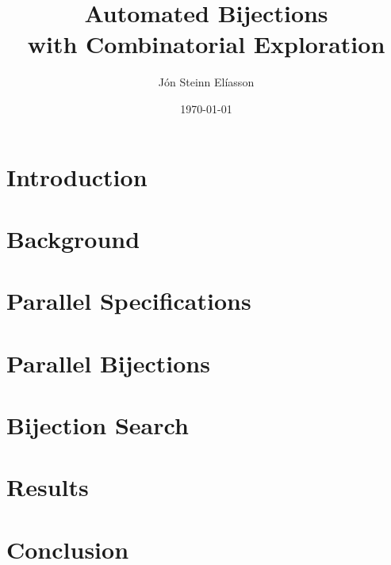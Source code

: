 \documentclass{beamer}
\title[Automated Bijections]{Automated Bijections\\with Combinatorial Exploration}
\author[Jón Steinn Elíasson]{Jón Steinn Elíasson}
\institute[Reykjavik University]{Reykjavík University}
\date{\today}
\begin{document}



\section{Introduction}


\section{Background}












\section{Parallel Specifications}
%



\section{Parallel Bijections}




\section{Bijection Search}

%

\section{Results}





\section{Conclusion}


\begin{frame}[allowframebreaks]
    \printbibliography{}
\end{frame}
\end{document}
